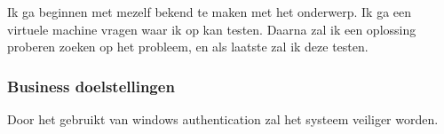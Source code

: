 Ik ga beginnen met mezelf bekend te maken met het onderwerp. Ik ga een virtuele machine vragen waar ik op kan testen. Daarna zal ik een oplossing proberen zoeken op het probleem, en als laatste zal ik deze testen.

\subsubsection{Business doelstellingen}

Door het gebruikt van windows authentication zal het systeem veiliger worden.

